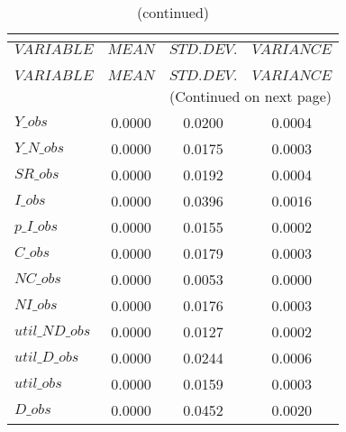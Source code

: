  
\begin{center}
\begin{longtable}{lccc} 
\caption{THEORETICAL MOMENTS}\\
 \label{Table:th_moments}\\
\toprule 
$VARIABLE       $	 & 	 $         MEAN$	 & 	 $    STD. DEV.$	 & 	 $     VARIANCE$\\
\midrule \endfirsthead 
\caption{(continued)}\\
 \toprule \\ 
$VARIABLE       $	 & 	 $         MEAN$	 & 	 $    STD. DEV.$	 & 	 $     VARIANCE$\\
\midrule \endhead 
\midrule \multicolumn{4}{r}{(Continued on next page)} \\ \bottomrule \endfoot 
\bottomrule \endlastfoot 
$Y\_obs         $	 & 	       0.0000	 & 	       0.0200	 & 	       0.0004 \\ 
$Y\_N\_obs      $	 & 	       0.0000	 & 	       0.0175	 & 	       0.0003 \\ 
$SR\_obs        $	 & 	       0.0000	 & 	       0.0192	 & 	       0.0004 \\ 
$I\_obs         $	 & 	       0.0000	 & 	       0.0396	 & 	       0.0016 \\ 
$p\_I\_obs      $	 & 	       0.0000	 & 	       0.0155	 & 	       0.0002 \\ 
$C\_obs         $	 & 	       0.0000	 & 	       0.0179	 & 	       0.0003 \\ 
$NC\_obs        $	 & 	       0.0000	 & 	       0.0053	 & 	       0.0000 \\ 
$NI\_obs        $	 & 	       0.0000	 & 	       0.0176	 & 	       0.0003 \\ 
$util\_ND\_obs  $	 & 	       0.0000	 & 	       0.0127	 & 	       0.0002 \\ 
$util\_D\_obs   $	 & 	       0.0000	 & 	       0.0244	 & 	       0.0006 \\ 
$util\_obs      $	 & 	       0.0000	 & 	       0.0159	 & 	       0.0003 \\ 
$D\_obs         $	 & 	       0.0000	 & 	       0.0452	 & 	       0.0020 \\ 
\end{longtable}
 \end{center}
